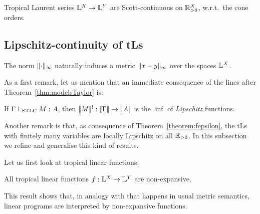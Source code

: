 \begin{theorem}\label{thm:ScottCont}
  Tropical Laurent series $\mathbb{L}^X\to\mathbb{L}^Y$ are Scott-continuous on $\mathbb{R}_{>0}^X$, w.r.t.\ the cone orders.
\end{theorem}


\subsection{Lipschitz-continuity of tLs}%


The norm $\lVert\cdot\rVert_\infty$ naturally induces a metric $\lVert x-y\rVert_{\infty}$ over the spaces $\mathbb{L}^{X}$.

As a first remark, let us mention that an immediate consequence of the lines after Theorem~\ref{thm:modelsTaylor} is:

\begin{corollary}\label{thm:M=infLip}
 If $\Gamma \vdash_{\mathrm{STLC}}M:A$, then $\llbracket M\rrbracket^!: \llbracket\Gamma\rrbracket \to \llbracket A\rrbracket$ is the $\inf$ of \emph{Lipschitz} functions.
\end{corollary}
 
Another remark is that, as consequence of Theorem~\ref{theorem:fepsilon}, the tLs with finitely many variables are locally Lipschitz on all $\mathbb{R}_{>0}$.
In this subsection we refine and generalise this kind of results.
%

Let us first look at tropical linear functions:


\begin{proposition}\label{prop:troplinear}
All tropical linear functions $f: \mathbb{L}^{X}\to \mathbb{L}^{Y}$ are non-expansive.  
\end{proposition}
This result shows that, in analogy with that happens in usual metric semantics, linear programs are interpreted by non-expansive functions. 

